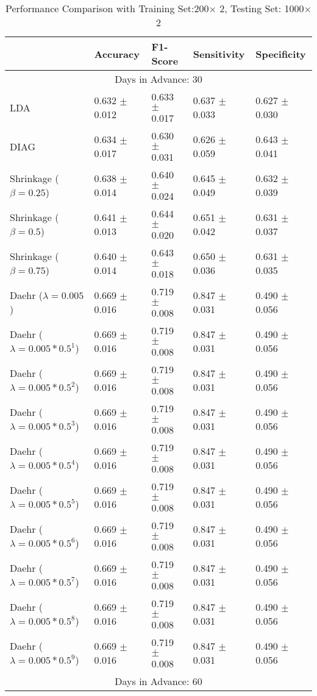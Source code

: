 \begin{table}
\caption{Performance Comparison with Training Set:200$\times$ 2, Testing Set: 1000$\times$2}
\footnotesize
\centering
\begin{tabular}{*{5}{l}}
\toprule
 & Accuracy & F1-Score & Sensitivity & Specificity\\
\hline\multicolumn{5}{c}{  Days in Advance: 30}\\\hline
LDA&0.632 $\pm$ 0.012&0.633 $\pm$ 0.017&0.637 $\pm$ 0.033&0.627 $\pm$ 0.030\\
DIAG&0.634 $\pm$ 0.017&0.630 $\pm$ 0.031&0.626 $\pm$ 0.059&0.643 $\pm$ 0.041\\
Shrinkage ($\beta=0.25$)&0.638 $\pm$ 0.014&0.640 $\pm$ 0.024&0.645 $\pm$ 0.049&0.632 $\pm$ 0.039\\
Shrinkage ($\beta=0.5$)&0.641 $\pm$ 0.013&0.644 $\pm$ 0.020&0.651 $\pm$ 0.042&0.631 $\pm$ 0.037\\
Shrinkage ($\beta=0.75$)&0.640 $\pm$ 0.014&0.643 $\pm$ 0.018&0.650 $\pm$ 0.036&0.631 $\pm$ 0.035\\
Daehr ($\lambda=0.005$)&0.669 $\pm$ 0.016&0.719 $\pm$ 0.008&0.847 $\pm$ 0.031&0.490 $\pm$ 0.056\\
Daehr ($\lambda=0.005*0.5^1$)&0.669 $\pm$ 0.016&0.719 $\pm$ 0.008&0.847 $\pm$ 0.031&0.490 $\pm$ 0.056\\
Daehr ($\lambda=0.005*0.5^2$)&0.669 $\pm$ 0.016&0.719 $\pm$ 0.008&0.847 $\pm$ 0.031&0.490 $\pm$ 0.056\\
Daehr ($\lambda=0.005*0.5^3$)&0.669 $\pm$ 0.016&0.719 $\pm$ 0.008&0.847 $\pm$ 0.031&0.490 $\pm$ 0.056\\
Daehr ($\lambda=0.005*0.5^4$)&0.669 $\pm$ 0.016&0.719 $\pm$ 0.008&0.847 $\pm$ 0.031&0.490 $\pm$ 0.056\\
Daehr ($\lambda=0.005*0.5^5$)&0.669 $\pm$ 0.016&0.719 $\pm$ 0.008&0.847 $\pm$ 0.031&0.490 $\pm$ 0.056\\
Daehr ($\lambda=0.005*0.5^6$)&0.669 $\pm$ 0.016&0.719 $\pm$ 0.008&0.847 $\pm$ 0.031&0.490 $\pm$ 0.056\\
Daehr ($\lambda=0.005*0.5^7$)&0.669 $\pm$ 0.016&0.719 $\pm$ 0.008&0.847 $\pm$ 0.031&0.490 $\pm$ 0.056\\
Daehr ($\lambda=0.005*0.5^8$)&0.669 $\pm$ 0.016&0.719 $\pm$ 0.008&0.847 $\pm$ 0.031&0.490 $\pm$ 0.056\\
Daehr ($\lambda=0.005*0.5^9$)&0.669 $\pm$ 0.016&0.719 $\pm$ 0.008&0.847 $\pm$ 0.031&0.490 $\pm$ 0.056\\
\hline\multicolumn{5}{c}{  Days in Advance: 60}\\\hline

\end{tabular}
\end{table}
